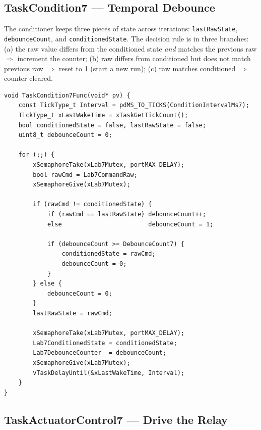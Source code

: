 \documentclass[12pt]{article}
\begin{document}
\subsection{TaskCondition7 --- Temporal Debounce}

The conditioner keeps three pieces of state across iterations: \texttt{lastRawState}, \texttt{debounceCount}, and \texttt{conditionedState}. The decision rule is in three branches: (a) the raw value differs from the conditioned state \emph{and} matches the previous raw $\Rightarrow$ increment the counter; (b) raw differs from conditioned but does not match previous raw $\Rightarrow$ reset to 1 (start a new run); (c) raw matches conditioned $\Rightarrow$ counter cleared.

\begin{lstlisting}[caption={TaskCondition7 --- 5-sample debounce}]
void TaskCondition7Func(void* pv) {
    const TickType_t Interval = pdMS_TO_TICKS(ConditionIntervalMs7);
    TickType_t xLastWakeTime = xTaskGetTickCount();
    bool conditionedState = false, lastRawState = false;
    uint8_t debounceCount = 0;

    for (;;) {
        xSemaphoreTake(xLab7Mutex, portMAX_DELAY);
        bool rawCmd = Lab7CommandRaw;
        xSemaphoreGive(xLab7Mutex);

        if (rawCmd != conditionedState) {
            if (rawCmd == lastRawState) debounceCount++;
            else                        debounceCount = 1;

            if (debounceCount >= DebounceCount7) {
                conditionedState = rawCmd;
                debounceCount = 0;
            }
        } else {
            debounceCount = 0;
        }
        lastRawState = rawCmd;

        xSemaphoreTake(xLab7Mutex, portMAX_DELAY);
        Lab7ConditionedState = conditionedState;
        Lab7DebounceCounter  = debounceCount;
        xSemaphoreGive(xLab7Mutex);
        vTaskDelayUntil(&xLastWakeTime, Interval);
    }
}
\end{lstlisting}

\subsection{TaskActuatorControl7 --- Drive the Relay}
\end{document}
